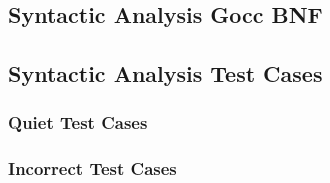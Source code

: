 
\subsection{Syntactic Analysis Gocc BNF}
\label{app:parser/gocc}



\clearpage

\subsection{Syntactic Analysis Test Cases}
\label{app:parser/testcases}

\subsubsection{Quiet Test Cases}
\label{app:parser/quiet}



\clearpage %

\subsubsection{Incorrect Test Cases}
\label{app:parser/incorrect}


